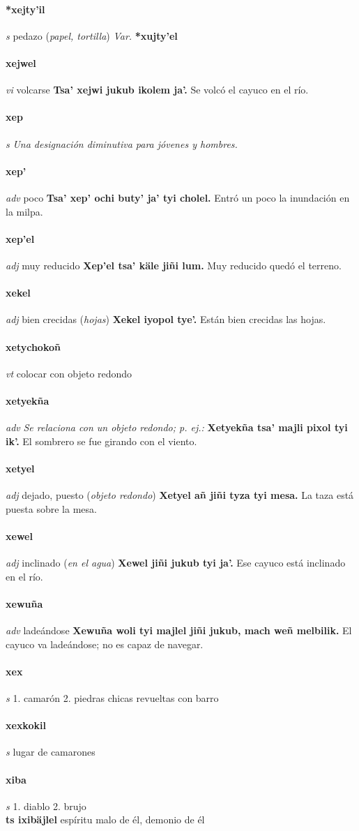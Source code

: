 \documentclass{scrbook}
\newcommand{\entry}[1]{\paragraph{#1}}
\newcommand{\onedefinition}[1]{#1.}
\newcommand{\nontranslationdef}[1]{\textit{#1}}
\newcommand{\partofspeech}[1]{\textit{#1}}
\newcommand{\spanishtranslation}[1]{#1}
\newcommand{\clarification}[1]{(\textit{#1})}
\newcommand{\cholexample}[1]{\textbf{#1}}
\newcommand{\exampletranslation}[1]{#1}
\newcommand{\secondaryentry}[1]{\\\textbf{#1}}
\newcommand{\secondtranslation}[1]{#1}
\newcommand{\variation}[1]{\textit{Var.} \textbf{#1}}
\begin{document}
\begin{multicols}{2}
\entry{*xejty'il}
\partofspeech{s}
\spanishtranslation{pedazo}
\clarification{papel, tortilla}
\variation{*xujty'el}

\entry{xejwel}
\partofspeech{vi}
\spanishtranslation{volcarse}
\cholexample{Tsa' xejwi jukub ikolem ja'.}
\exampletranslation{Se volcó el cayuco en el río.}

\entry{xep}
\partofspeech{s}
\nontranslationdef{Una designación diminutiva para jóvenes y hombres.}

\entry{xep'}
\partofspeech{adv}
\spanishtranslation{poco}
\cholexample{Tsa' xep' ochi buty' ja' tyi cholel.}
\exampletranslation{Entró un poco la inundación en la milpa.}

\entry{xep'el}
\partofspeech{adj}
\spanishtranslation{muy reducido}
\cholexample{Xep'el tsa' käle jiñi lum.}
\exampletranslation{Muy reducido quedó el terreno.}

\entry{xekel}
\partofspeech{adj}
\spanishtranslation{bien crecidas}
\clarification{hojas}
\cholexample{Xekel iyopol tye'.}
\exampletranslation{Están bien crecidas las hojas.}

\entry{xetychokoñ}
\partofspeech{vt}
\spanishtranslation{colocar con objeto redondo}

\entry{xetyekña}
\partofspeech{adv}
\nontranslationdef{Se relaciona con un objeto redondo; p. ej.:}
\cholexample{Xetyekña tsa' majli pixol tyi ik'.}
\exampletranslation{El sombrero se fue girando con el viento.}

\entry{xetyel}
\partofspeech{adj}
\spanishtranslation{dejado, puesto}
\clarification{objeto redondo}
\cholexample{Xetyel añ jiñi tyza tyi mesa.}
\exampletranslation{La taza está puesta sobre la mesa.}

\entry{xewel}
\partofspeech{adj}
\spanishtranslation{inclinado}
\clarification{en el agua}
\cholexample{Xewel jiñi jukub tyi ja'.}
\exampletranslation{Ese cayuco está inclinado en el río.}

\entry{xewuña}
\partofspeech{adv}
\spanishtranslation{ladeándose}
\cholexample{Xewuña woli tyi majlel jiñi jukub, mach weñ melbilik.}
\exampletranslation{El cayuco va ladeándose; no es capaz de navegar.}

\entry{xex}
\partofspeech{s}
\onedefinition{1}
\spanishtranslation{camarón}
\onedefinition{2}
\spanishtranslation{piedras chicas revueltas con barro}

\entry{xexkokil}
\partofspeech{s}
\spanishtranslation{lugar de camarones}

\entry{xiba}
\partofspeech{s}
\onedefinition{1}
\spanishtranslation{diablo}
\onedefinition{2}
\spanishtranslation{brujo}
\secondaryentry{ts ixibäjlel}
\secondtranslation{espíritu malo de él, demonio de él}


\end{multicols}
\end{document}

